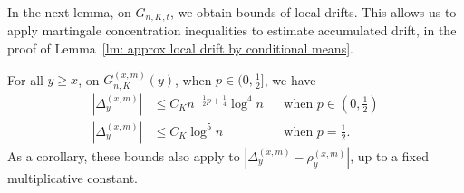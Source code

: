 \documentclass[EJP]{ejpecp} %
\begin{document}
In the next lemma, on $G_{n, K, t}$, we obtain bounds of local drifts. This allows us to apply martingale concentration inequalities to estimate accumulated drift, in the proof of Lemma~\ref{lm: approx local drift by conditional means}.
\begin{lemma}\label{lm:lipchitz-bound-on-good-event}
	For all  $y \ge x$, on $G_{n, K}^{(x,m)}(y)$, when $p \in (0,\frac{1}{2}]$,  we have
	\begin{align*}
		\left| \Delta_y^{(x,m)} \right| &\le C_K n^{-\frac{1}{2}p + \frac{1}{4}} \log^4 n &&\text{when }p \in \left(0,\frac{1}{2}\right)\\
		\left| \Delta_y^{(x,m)} \right| &\le C_K \log^5 n &&\text{when }p = \frac{1}{2}
		.\end{align*}
	As a corollary, these bounds also apply to $\left| \Delta_y^{(x,m)} - \rho_y^{(x,m)} \right| $, up to a fixed multiplicative constant.
\end{lemma}
\end{document}
